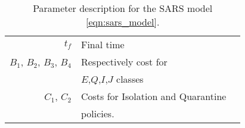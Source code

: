 \begin{table}[htb]
\begin{center}
\begin{tabular}{@{}rll@{}}
        \\
        $t_f$
          & Final time 
        \\
        $B_1$, $B_2$, $B_3$, $B_4$
        & Respectively cost for 
        \\
        &
          $E$,$Q$,$I$,$J$ classes
        \\
        $C_1$, $C_2$
        & Costs for Isolation and Quarantine 
        \\
          & policies.
        \\
        \bottomrule
      \end{tabular}
     \caption{Parameter description for the SARS model
     \eqref{eqn:sars_model}.}
     \label{tbl:sars_table}
     \end{center}
\end{table}